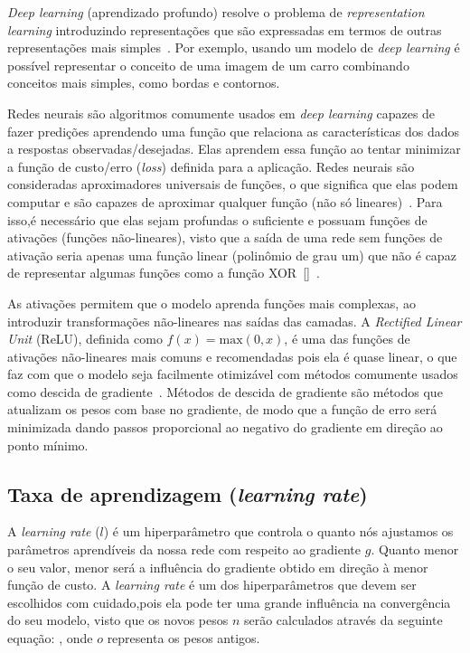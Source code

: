 \textit{Deep learning} (aprendizado profundo) resolve o problema de \textit{representation learning} introduzindo representações que são expressadas em termos de outras representações mais simples~\cite{deeplearning}. Por exemplo, usando um modelo de \textit{deep learning} é possível representar o conceito de uma imagem de um carro combinando conceitos mais simples, como bordas e contornos.

Redes neurais são algoritmos comumente usados em \textit{deep learning} capazes de fazer predições aprendendo uma função que relaciona as características dos dados a respostas observadas/desejadas. Elas aprendem essa função ao tentar minimizar a função de custo/erro (\textit{loss}) definida para a aplicação. Redes neurais são consideradas aproximadores universais de funções, o que significa que elas podem computar e são capazes de aproximar qualquer função (não só lineares)~\cite{dlbook}. Para isso,é necessário que elas sejam profundas o suficiente e possuam funções de ativações (funções não-lineares), visto que a saída de uma rede sem funções de ativação seria apenas uma função linear (polinômio de grau um) que não é capaz de representar algumas funções como a função \acrshort{XOR}~[]~\cite{deeplearning}. 

As ativações permitem que o modelo aprenda funções mais complexas, ao introduzir transformações não-lineares nas saídas das camadas. A \textit{Rectified Linear Unit} (\acrshort{ReLU}), definida como $f(x) = \text{max}(0, x)$, é uma das funções de ativações não-lineares mais comuns e recomendadas pois ela é quase linear, o que faz com que o modelo seja facilmente otimizável com métodos comumente usados como descida de gradiente~\cite{rumelhart1988learning}. Métodos de descida de gradiente são métodos que atualizam os pesos com base no gradiente, de modo que a função de erro será minimizada dando passos proporcional ao negativo do gradiente em direção ao ponto mínimo. 


\subsection{Taxa de aprendizagem (\textit{learning rate})}
A \textit{learning rate} ($l$) é um hiperparâmetro que controla o quanto nós ajustamos os parâmetros aprendíveis da nossa rede com respeito ao gradiente $g$. Quanto menor o seu valor, menor será a influência do gradiente obtido em direção à menor função de custo. A \textit{learning rate} é um dos hiperparâmetros que devem ser escolhidos com cuidado,pois ela pode ter uma grande influência na convergência do seu modelo, visto que os novos pesos $n$ serão calculados através da seguinte equação: , onde $o$ representa os pesos antigos.

